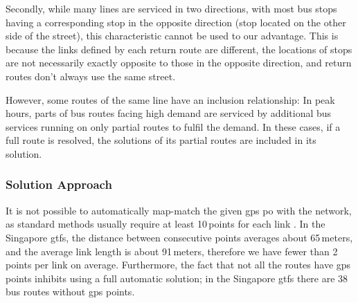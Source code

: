 Secondly, while many lines are serviced in two directions, with most bus stops having a corresponding stop in the opposite direction (stop located on the other side of the street), this characteristic cannot be used to our advantage. This is because the links defined by each return route are different, the locations of stops are not necessarily exactly opposite to those in the opposite direction, and return routes  don't always use the same street.

However, some routes of the same line have an inclusion relationship: In peak hours, parts of bus routes facing high demand are serviced by additional bus services running on only partial routes to fulfil the demand. In these cases, if a full route is resolved, the solutions of its partial routes are included in its solution.

\subsubsection{Solution Approach}
It is not possible to automatically map-match the given \gls{gps} po with the network, as standard methods usually require at least 10\,points for each link \citep[][]{SchuesslerAxhausen_TechRep_IVT_2009}. In the Singapore \gls{gtfs}, the distance between consecutive points averages about 65\,meters, and the average link length is about 91\,meters, therefore we have fewer than 2\,points per link on average. Furthermore, the fact that not all the routes have \gls{gps} points inhibits using a full automatic solution; in the Singapore \gls{gtfs} there are 38\,bus routes without \gls{gps} points.


